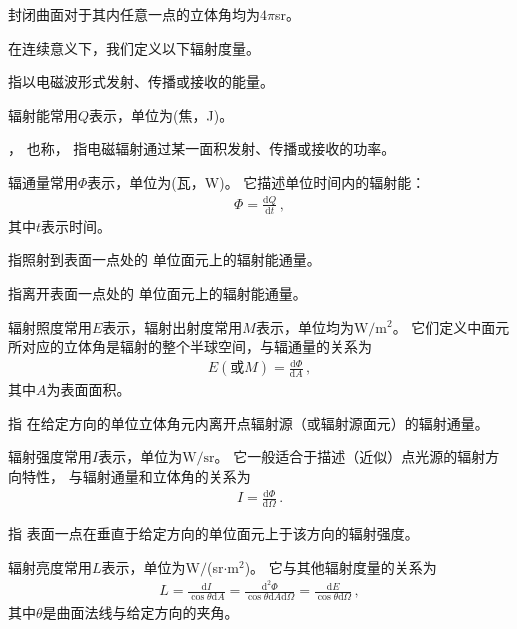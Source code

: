 \begin{corollary}
      封闭曲面对于其内任意一点的立体角均为$4\pi$sr。
\end{corollary}

在连续意义下，我们定义以下辐射度量。

\begin{definition}
      指以电磁波形式发射、传播或接收的能量。
\end{definition}
辐射能常用$Q$表示，单位为(焦，J)。

\begin{definition}
      ，
      也称，
      指电磁辐射通过某一面积发射、传播或接收的功率。
\end{definition}
辐通量常用$\varPhi$表示，单位为(瓦，W)。
它描述单位时间内的辐射能：
\begin{align}
      \varPhi=\frac{\mathrm{d}Q}{\mathrm{d}t}\, ,
\end{align}
其中$t$表示时间。

\begin{definition}
      指照射到表面一点处的
      单位面元上的辐射能通量。
\end{definition}
\begin{definition}
      指离开表面一点处的
      单位面元上的辐射能通量。
\end{definition}
辐射照度常用$E$表示，辐射出射度常用$M$表示，单位均为$\text{W}/\text{m}^2$。
它们定义中面元所对应的立体角是辐射的整个半球空间，与辐通量的关系为
\begin{align}
      E(\text{或}M)=\frac{\mathrm{d}\varPhi}{\mathrm{d}A}\, ,
\end{align}
其中$A$为表面面积。

\begin{definition}
      指
      在给定方向的单位立体角元内离开点辐射源（或辐射源面元）的辐射通量。
\end{definition}
辐射强度常用$I$表示，单位为$\text{W}/\text{sr}$。
它一般适合于描述（近似）点光源的辐射方向特性，
与辐射通量和立体角的关系为
\begin{align}
      I=\frac{\mathrm{d}\varPhi}{\mathrm{d}\varOmega}\, .
\end{align}

\begin{definition}
      指
      表面一点在垂直于给定方向的单位面元上于该方向的辐射强度。
\end{definition}
辐射亮度常用$L$表示，单位为W$/$(sr$\cdot$m$^2$)。
它与其他辐射度量的关系为
\begin{align}\label{eq:5.ex-radiance}
      L=\frac{\mathrm{d}I}{\cos\theta\mathrm{d}A}=\frac{\mathrm{d}^2\varPhi}{\cos\theta\mathrm{d}A\mathrm{d}\varOmega}=\frac{\mathrm{d}E}{\cos\theta\mathrm{d}\varOmega}\, ,
\end{align}
其中$\theta$是曲面法线与给定方向的夹角。


